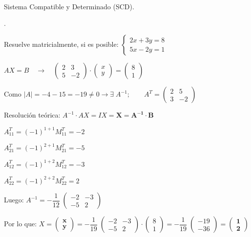 \begin{proofw}
Sistema Compatible y Determinado (SCD).
	
\end{proofw}


\begin{ejre}.

Resuelve matricialmente, si es posible: $\begin{cases} 2x+3y=8\\5x-2y=1  \end{cases}$	
\end{ejre}

\begin{proofw}\renewcommand{\qedsymbol}{$\diamond$}
$ AX=B \quad \to \quad  	\left( \begin{matrix} 2&3\\5&-2  \end{matrix} \right) \cdot 	\left( \begin{matrix} x\\y   \end{matrix} \right) = 	\left( \begin{matrix}   8\\1 \end{matrix} \right)$

\noindent Como $|A|=-4-15=-19\neq 0 \to \exists\;  A^{-1}; \qquad A^T=\left( \begin{matrix} 2&5\\3&-2  \end{matrix} \right)$

\noindent Resolución teórica: $A^{-1}\cdot AX=IX=\boldsymbol{X=A^{-1}\cdot B}$

\begin{multicols}{2}
\noindent $A^T_{11}=(-1)^{1+1}M^T_{11}=-2$

\noindent $A^T_{21}=(-1)^{2+1}M^T_{21}=-5$

\noindent $A^T_{12}=(-1)^{1+2}M^T_{12}=-3$

\noindent $A^T_{22}=(-1)^{2+2}M^T_{22}=2$
\end{multicols}

Luego: $A^{-1}= - \dfrac 1 {12} \; \left( \begin{matrix} -2&-3\\-5&2  \end{matrix} \right)$

\noindent Por lo que: $X=\boldsymbol{\left( \begin{matrix} x\\y   \end{matrix} \right)} =
 - \dfrac 1 {19} \; \left( \begin{matrix} -2&-3\\-5&2  \end{matrix} \right) \cdot \left( \begin{matrix}   8\\1 \end{matrix} \right)=
 - \dfrac 1 {19} \; \left( \begin{matrix}   -19\\-36 \end{matrix} \right)=
 \boldsymbol{\left( \begin{matrix}   1\\2 \end{matrix} \right)}$
 

\end{proofw}
